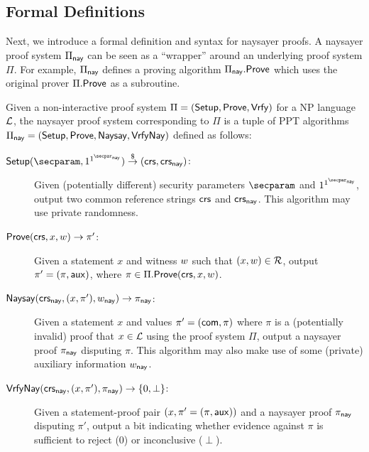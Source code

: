 \subsection{Formal Definitions}\label{sec:naysayer_def}

Next, we introduce a formal definition and syntax for naysayer proofs. A naysayer proof system $\Pi_{\mathsf{nay}}$ can be seen as a ``wrapper'' around an underlying proof system $\Pi$. For example, $\Pi_{\sf nay}$ defines a proving algorithm $\Pi_{\mathsf{nay}}.\mathsf{Prove}$ which uses the original prover $\Pi.\mathsf{Prove}$ as a subroutine.

\begin{definition}\label{def:naysayer_proof}
Given a non-interactive proof system $\Pi = (\mathsf{Setup}, \mathsf{Prove}, \mathsf{Vrfy})$ for a NP language $\mathcal{L}$, the naysayer proof system corresponding to $\Pi$ is a tuple of PPT algorithms $\Pi_{\mathsf{nay}} = (\mathsf{Setup}, \mathsf{Prove},\allowbreak \mathsf{Naysay}, {\mathsf{Vrfy}}\mathsf{Nay})$ defined as follows:
    \begin{description}
        \item[$\setup(\secparam, 1^{\naysecparam}) \randout (\crs,\crs_{\nay})$:] Given (potentially different) security parameters $\secparam$ and $1^{\naysecparam}$, output two common reference strings $\mathsf{crs}$ and $\mathsf{crs}_{\mathsf{nay}}$. This algorithm may use private randomness.
        \item[$\mathsf{Prove}(\mathsf{crs}, x, w) \to \pi'$:] Given a statement $x$ and witness $w$ such that $(x,\allowbreak w) \in \mathcal{R}$, 
        output $\pi' = (\pi, \mathsf{aux})$, where $\pi \in \Pi.\mathsf{Prove}(\mathsf{crs}, x, w)$.
        \item[$\mathsf{Naysay}(\mathsf{crs}_{\mathsf{nay}}, (x,\pi'), w_{\mathsf{nay}}) \rightarrow \pi_{\mathsf{nay}}$:] Given a statement $x$ and values $\pi' = (\mathsf{com},\allowbreak \pi)$ where $\pi$ is a (potentially invalid) proof that $x \in \mathcal{L}$ using the proof system $\Pi$, output a naysayer proof $\pi_{\mathsf{nay}}$ disputing $\pi$. This algorithm may also make use of some (private) auxiliary information $w_{\mathsf{nay}}$.
        \item[${\mathsf{Vrfy}}\mathsf{Nay}(\mathsf{crs}_{\mathsf{nay}}, (x,\pi'), \pi_{\mathsf{nay}}) \rightarrow \{0, \perp\}$:] Given a statement-proof pair $(x,\allowbreak \pi'=(\pi,\mathsf{aux}))$ and a naysayer proof $\pi_{\mathsf{nay}}$ disputing $\pi'$, output a bit indicating whether evidence against $\pi$ is sufficient to reject (0) or inconclusive ($\perp$).
    \end{description}
\end{definition}

